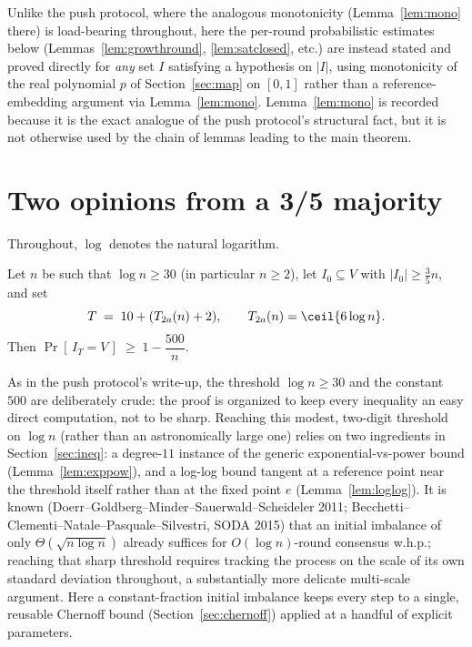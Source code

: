 \begin{remark}
  Unlike the push protocol, where the analogous monotonicity
  (Lemma~\ref{lem:mono} there) is load-bearing throughout, here the
  per-round probabilistic estimates below (Lemmas~\ref{lem:growthround},
  \ref{lem:satclosed}, etc.) are instead stated and proved directly for
  \emph{any} set $I$ satisfying a hypothesis on $|I|$, using monotonicity of
  the real polynomial $p$ of Section~\ref{sec:map} on $[0,1]$ rather than a
  reference-embedding argument via Lemma~\ref{lem:mono}. Lemma~\ref{lem:mono}
  is recorded because it is the exact analogue of the push protocol's
  structural fact, but it is not otherwise used by the chain of lemmas
  leading to the main theorem.
\end{remark}

\section{Two opinions from a 3/5 majority}\label{sec:main-statement}

Throughout, $\log$ denotes the natural logarithm.

\begin{theorem}
  \label{thm:main}
  \leanok
  Let $n$ be such that $\log n \ge 30$ (in particular $n \ge 2$), let
  $I_0 \subseteq V$ with $|I_0| \ge \tfrac35 n$, and set
  \[
    T \;=\; 10 + (T_{2a}(n) + 2), \qquad T_{2a}(n) = \ceil{6\log n}.
  \]
  Then $\Pr[\, I_T = V \,] \;\ge\; 1 - \dfrac{500}{n}$.
\end{theorem}

\begin{remark}
  As in the push protocol's write-up, the threshold $\log n \ge 30$ and
  the constant $500$ are deliberately crude: the proof is organized to keep
  every inequality an easy direct computation, not to be sharp. Reaching
  this modest, two-digit threshold on $\log n$ (rather than an
  astronomically large one) relies on two ingredients in
  Section~\ref{sec:ineq}: a degree-$11$ instance of the generic
  exponential-vs-power bound (Lemma~\ref{lem:exppow}), and a log-log bound
  tangent at a reference point near the threshold itself rather than at the
  fixed point $e$ (Lemma~\ref{lem:loglog}). It is known
  (Doerr--Goldberg--Minder--Sauerwald--Scheideler 2011;
  Becchetti--Clementi--Natale--Pasquale--Silvestri, SODA 2015) that an
  initial imbalance of only $\Theta(\sqrt{n\log n})$ already suffices for
  $O(\log n)$-round consensus w.h.p.; reaching that sharp threshold
  requires tracking the process on the scale of its own standard deviation
  throughout, a substantially more delicate multi-scale argument. Here a
  constant-fraction initial imbalance keeps every step to a single,
  reusable Chernoff bound (Section~\ref{sec:chernoff}) applied at a handful
  of explicit parameters.
\end{remark}

